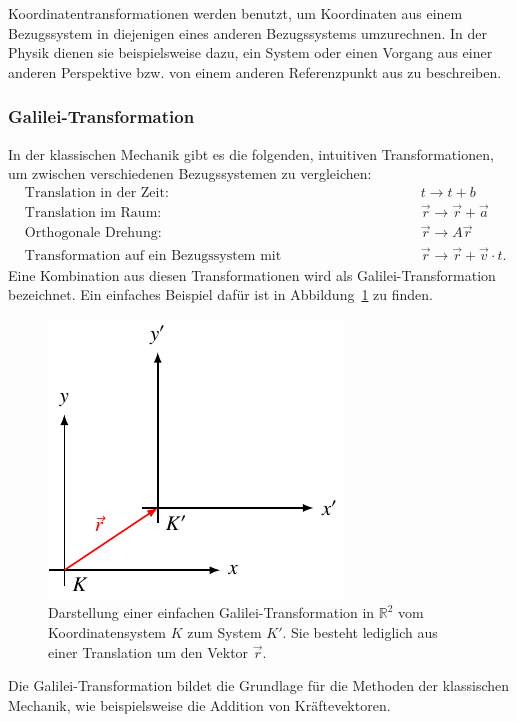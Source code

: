Koordinatentransformationen werden benutzt,
um Koordinaten aus einem Bezugssystem in diejenigen eines anderen Bezugssystems umzurechnen.
In der Physik dienen sie beispielsweise dazu,
ein System oder einen Vorgang aus einer anderen Perspektive bzw.
von einem anderen Referenzpunkt aus zu beschreiben.

\subsubsection{Galilei-Transformation 
\label{relativ:section:galilei-trafo}}

In der klassischen Mechanik gibt es die folgenden,
intuitiven Transformationen, um zwischen verschiedenen Bezugssystemen
zu vergleichen:
\[
\begin{aligned}
    &\text{Translation in der Zeit: } && t \rightarrow t + b \\
    &\text{Translation im Raum: } && \vec{r} \rightarrow \vec{r} + \vec{a} \\
    &\text{Orthogonale Drehung: } && \vec{r} \rightarrow A \vec{r} \\
    &\text{Transformation auf ein Bezugssystem mit Relativgeschwindigkeit: } && \vec{r} \rightarrow \vec{r} + \vec{v} \cdot t .
\end{aligned}
\]
Eine Kombination aus diesen Transformationen wird als Galilei-Transformation bezeichnet.
Ein einfaches Beispiel dafür ist in Abbildung~\ref{relativ:fig:galilei-trafo} zu finden.
\begin{figure}
    \centering
    \includegraphics{papers/relativ/tikz/galilei_trafo.pdf}
    \caption{Darstellung einer einfachen Galilei-Transformation in \(\mathbb{R}^2\)
    vom Koordinatensystem \(K\) zum System \(K'\).
    Sie besteht lediglich aus einer Translation um den Vektor \(\vec{r}\).
    \label{relativ:fig:galilei-trafo}}
\end{figure}
Die Galilei-Transformation bildet die Grundlage für die Methoden der klassischen Mechanik,
wie beispielsweise die Addition von Kräftevektoren.

